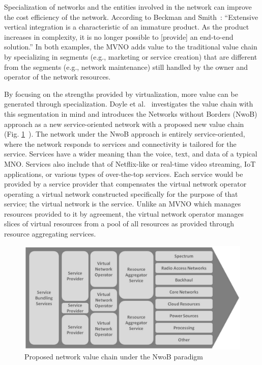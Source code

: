 \documentclass[12pt,dvipsnames]{report}
\begin{document}
Specialization of networks and the entities involved in the network can improve the cost efficiency of the network.  According to Beckman and Smith~\cite{1421931}: ``Extensive vertical integration is a characteristic of an immature product.  As the product increases in complexity, it is no longer possible to [provide] an end-to-end solution.'' In both examples, the MVNO adds value to the traditional value chain by specializing in segments (e.g., marketing or service creation) that are different from the segments (e.g., network maintenance) still handled by the owner and operator of the network resources.

By focusing on the strengths provided by virtualization, more value can be generated through specialization.  Doyle et al.~\cite{6737248} investigates the value chain with this segmentation in mind and introduces the Networks without Borders (NwoB) approach as a new service-oriented network with a proposed new value chain (Fig. \ref{fig:NwoBValueChain}~\cite{6737248}).  The network under the NwoB approach is entirely service-oriented, where the network responds to services and connectivity is tailored for the service.  Services have a wider meaning than the voice, text, and data of a typical MNO.  Services also include that of Netflix-like or real-time video streaming, IoT applications, or various types of over-the-top services.  Each service would be provided by a service provider that compensates the virtual network operator operating a virtual network constructed specifically for the purpose of that service; the virtual network is the service.  Unlike an MVNO which manages resources provided to it by agreement, the virtual network operator manages slices of virtual resources from a pool of all resources as provided through resource aggregating services.

\begin{figure}
	\centering
	\includegraphics[width=\linewidth]{NwoBValueChain}
	\caption[Proposed network value chain under the NwoB paradigm]{\small Proposed network value chain under the NwoB paradigm~\cite{6737248}}
	\label{fig:NwoBValueChain}
\end{figure}
\end{document}
